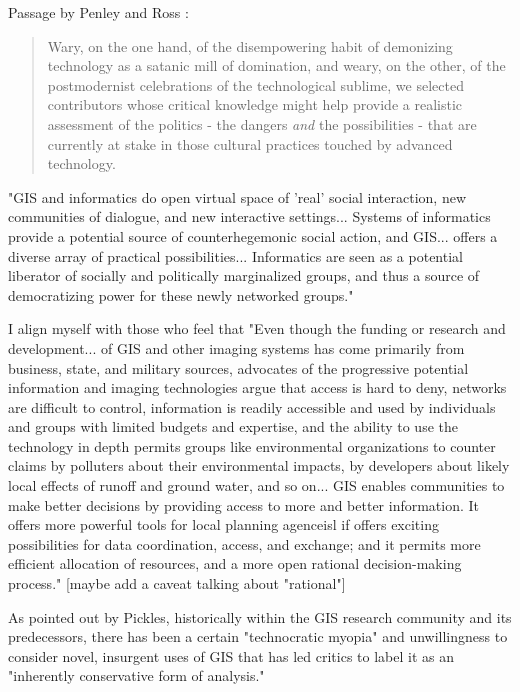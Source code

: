 Passage by Penley and Ross \cite{penleyTechnoculture1991}:

\blockquote{Wary, on the one hand, of the disempowering habit of demonizing technology as a satanic mill of domination, and weary, on the other, of the postmodernist celebrations of the technological sublime, we selected contributors whose critical knowledge might help provide a realistic assessment of the politics - the dangers \textit{and} the possibilities - that are currently at stake in those cultural practices touched by advanced technology.}

"GIS and informatics do open virtual space of 'real' social interaction, new communities of dialogue, and new interactive settings... Systems of informatics provide a potential source of counterhegemonic social action, and GIS... offers a diverse array of practical possibilities... Informatics are seen as a potential liberator of socially and politically marginalized groups, and thus a source of democratizing power for these newly networked groups." \cite{picklesRepresentationsElectronicAge1994}

I align myself with those who feel that "Even though the funding or research and development... of GIS and other imaging systems has come primarily from business, state, and military sources, advocates of the progressive potential information and imaging technologies argue that access is hard to deny, networks are difficult to control, information is readily accessible and used by individuals and groups with limited budgets and expertise, and the ability to use the technology in depth permits groups like environmental organizations to counter claims by polluters about their environmental impacts, by developers about likely local effects of runoff and ground water, and so on... GIS enables communities to make better decisions by providing access to more and better information. It offers more powerful tools for local planning agenceisl if offers exciting possibilities for data coordination, access, and exchange; and it permits more efficient allocation of resources, and a more open rational decision-making process." \cite{picklesRepresentationsElectronicAge1994} [maybe add a caveat talking about "rational"]

As pointed out by Pickles, historically within the GIS research community and its predecessors, there has been a certain "technocratic myopia" and unwillingness to consider novel, insurgent uses of GIS that has led critics to label it as an "inherently conservative form of analysis." \cite{picklesRepresentationsElectronicAge1994}

